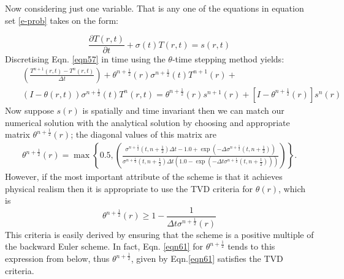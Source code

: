 Now considering just one variable. That is any one of 
the equations in equation set \ref{e-prob} takes on the form: 

\begin{equation}
\displaystyle\frac{\partial {T}\left({r},t\right)} {\partial t}+{\sigma}\left(t\right){T}\left({r},t\right)={s}\left({r},t\right)
\label{eqn57}
\end{equation}
Discretising Eqn. \ref{eqn57} in time using the $\theta$-time stepping method yields:
\begin{eqnarray}
&&\left(\displaystyle\frac{{{T}}^{n+1}\left({r},t\right)-{{T}}^{n}\left({r},t\right)}{\Delta t}\right)+{\theta}^{n+\frac{1}{2}}\left({r}\right){\sigma}^{n+\frac{1}{2}}\left(t\right){{T}}^{n+1}\left({r}\right)+   \nonumber \\
&& \left({I}-{\theta}\left({r},t\right)\right){\sigma}^{n+\frac{1}{2}}\left(t\right){{T}}^{n}\left({r},t\right)=  {\theta}^{n+\frac{1}{2}}\left({r}\right){s}^{n+1}\left({r}\right)+\left[{I}-{\theta}^{n+\frac{1}{2}}\left({r}\right)\right]{s}^{n}\left({r}\right)
\label{eqn60}
\end{eqnarray}
Now suppose ${s}\left({r}\right)$ is spatially and time invariant then we can match our numerical solution with the analytical solution by choosing and appropriate matrix ${\theta}^{n+\frac{1}{2}}\left({r}\right)$; the diagonal values of this matrix are
\begin{eqnarray}
{\theta}^{n+\frac{1}{2}}\left({r}\right) = \max \left\{ 
0.5,
\left(\displaystyle\frac
{{\sigma}^{n+\frac{1}{2}}\left(t,n+\frac{1}{2}\right)\Delta t-1.0+\exp\left(-\Delta{\sigma}^{n+\frac{1}{2}}\left(t,n+\frac{1}{2}\right)\right)} 
{{\sigma}^{n+\frac{1}{2}}\left(t,n+\frac{1}{2}\right)\Delta t\left(1.0-\exp\left(-\Delta t{\sigma}^{n+\frac{1}{2}}\left(t,n+\frac{1}{2}\right) \right)\right) }
\right)
\right\}. 
\label{eqn61}
\end{eqnarray} 
However, if the most important attribute of the scheme is that it achieves physical realism then it is appropriate to use the TVD criteria for ${\theta}\left({r}\right)$, which is
\begin{equation}
{\theta}^{n+\frac{1}{2}} \left({r}\right) \geq 1-\displaystyle\frac{1}{\Delta t {\sigma}^{n+\frac{1}{2}}\left({r}\right)}
\label{eqn62}
\end{equation}
This criteria is easily derived by ensuring that the scheme is a positive multiple of the backward Euler scheme.  In fact, Eqn. \ref{eqn61} for $\theta^{n+\frac{1}{2}}$ tends to this expression from below, thus $\theta^{n+\frac{1}{2}}$, given by Eqn.\ref{eqn61} satisfies the TVD criteria.

